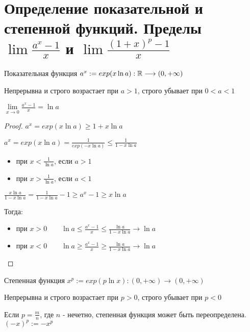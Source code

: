 \section{Определение показательной и степенной функций. Пределы $\lim{\frac{a^x - 1}{x}}$ и $\lim{\frac{(1+x)^p - 1}{x}}$}
\begin{conj}
    Показательная функция \qquad $a^x := exp(x \ln{a}): \mathbb{R} \longrightarrow (0, +\infty)$
    
    Непрерывна и строго возрастает при $a > 1$, строго убывает при $0 < a < 1$
\end{conj}

\begin{theorem-non}
    $\lim\limits_{x \rightarrow 0}{\frac{a^x - 1}{x}} = \ln{a}$

    \begin{proof}
        $a^x = exp(x \ln{a}) \geqslant 1 + x \ln{a}$

        $a^x = exp(x \ln{a}) = \frac{1}{exp(-x\ln{a})} \leqslant \frac{1}{1 - x \ln{a}}$
        \begin{itemize}
            \item[] при $x < \frac{1}{\ln{a}}$, если $a > 1$
            \item[] при $x > \frac{1}{\ln{a}}$, если $a < 1$ 
        \end{itemize}

        $\frac{x\ln{a}}{1 - x \ln{a}} = \frac{1}{1 - x \ln{a}} - 1 \geqslant a^x - 1 \geqslant x\ln{a}$

        Тогда:
        \begin{itemize}
            \item[] при $x > 0 \qquad \ln{a} \leqslant \frac{a^x - 1}{x} \leqslant \frac{\ln{a}}{1 - x \ln{a}} \longrightarrow \ln{a}$
            \item[] при $x < 0 \qquad \ln{a} \geqslant \frac{a^x - 1}{x} \geqslant \frac{\ln{a}}{1 - x \ln{a}} \longrightarrow \ln{a}$
        \end{itemize}
    \end{proof}
\end{theorem-non}

\begin{conj}
        Степенная функция $x^p := exp(p \ln{x}) : (0, +\infty) \longrightarrow (0, +\infty)$

        Непрерывна и строго возрастает при $p > 0$, строго убывает при $p < 0$

        Если $p = \frac{m}{n}$, где $n$ - нечетно, степенная функция может быть переопределена. $(-x)^p := -x^p$
\end{conj}

